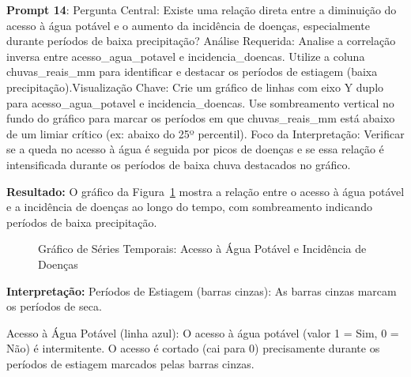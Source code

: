 \documentclass[12pt, a4paper, onecolumn]{article}
\begin{document}
    \textbf{Prompt 14}: Pergunta Central: Existe uma relação direta entre a diminuição do acesso à água potável e o aumento da incidência de doenças, especialmente durante períodos de baixa precipitação? Análise Requerida: Analise a correlação inversa entre acesso\_agua\_potavel e incidencia\_doencas. Utilize a coluna chuvas\_reais\_mm para identificar e destacar os períodos de estiagem (baixa precipitação).Visualização Chave: Crie um gráfico de linhas com eixo Y duplo para acesso\_agua\_potavel e incidencia\_doencas. Use sombreamento vertical no fundo do gráfico para marcar os períodos em que chuvas\_reais\_mm está abaixo de um limiar crítico (ex: abaixo do 25º percentil).
    Foco da Interpretação: Verificar se a queda no acesso à água é seguida por picos de doenças e se essa relação é intensificada durante os períodos de baixa chuva destacados no gráfico.
    \vspace{0.5cm}

    \textbf{Resultado:} O gráfico da Figura~\ref{fig:serie_temporal_acesso_agua_doencas} mostra a relação entre o acesso à água potável e a incidência de doenças ao longo do tempo, com sombreamento indicando períodos de baixa precipitação.
    \vspace{0.5cm}

    \begin{figure}
        \centering
        \caption{Gráfico de Séries Temporais: Acesso à Água Potável e Incidência de Doenças}
        \label{fig:serie_temporal_acesso_agua_doencas}
    \end{figure}

    \textbf{Interpretação:} Períodos de Estiagem (barras cinzas): As barras cinzas marcam os períodos de seca.

    Acesso à Água Potável (linha azul): O acesso à água potável (valor 1 = Sim, 0 = Não) é intermitente. O acesso é cortado (cai para 0) precisamente durante os períodos de estiagem marcados pelas barras cinzas.
\end{document}
